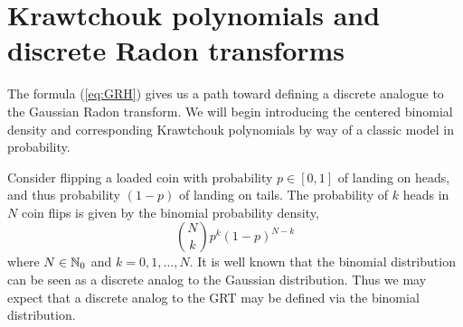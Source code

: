 

\section{Krawtchouk polynomials and discrete Radon transforms}



The formula (\ref{eq:GRH}) gives us a path toward defining a discrete analogue to the Gaussian Radon transform. We will begin introducing the centered binomial density and corresponding Krawtchouk polynomials by way of a classic model in probability.

Consider flipping a loaded coin with probability $p \in [0,1]$ of landing on heads, and thus probability $(1 - p)$ of landing on tails. The probability of $k$ heads in $N$ coin flips is given by the binomial probability density,
\[
  \binom{N}{k}p^k(1-p)^{N-k}
\]
where $N \in \mathbb{N}_0$ and $k = 0, 1, \ldots, N$. It is well known that the binomial distribution can be seen as a discrete analog to the Gaussian distribution. Thus we may expect that a discrete analog to the GRT may be defined via the binomial distribution.

